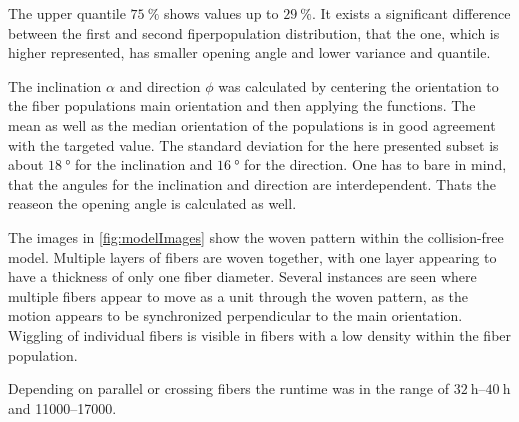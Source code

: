 The upper quantile $\SI{75}{\percent}$ shows values up to $\SI{29}{\percent}$.
It exists a significant difference between the first and second fiperpopulation distribution, that the one, which is higher represented, has smaller opening angle and lower variance and quantile.
\par
The inclination $\alpha$ and direction $\phi$ was calculated by centering the orientation to the fiber populations main orientation and then applying the functions.
The mean as well as the median orientation of the populations is in good agreement with the targeted value.
The standard deviation for the here presented subset is about $\SI{18}{\degree}$ for the inclination and $\SI{16}{\degree}$  for the direction.
One has to bare in mind, that the angules for the inclination and direction are interdependent.
Thats the reaseon the opening angle is calculated as well.
\par
%
The images in \cref{fig:modelImages} show the woven pattern within the collision-free model.
Multiple layers of fibers are woven together, with one layer appearing to have a thickness of only one fiber diameter.
Several instances are seen where multiple fibers appear to move as a unit through the woven pattern,\eg{} as the motion appears to be synchronized perpendicular to the main orientation.
Wiggling of individual fibers is visible in fibers with a low density within the fiber population.
\par
%
Depending on parallel or crossing fibers the runtime was in the range of $\SIrange{32}{40}{\hour}$ and \SIrange{11000}{17000}{\steps}.
%
